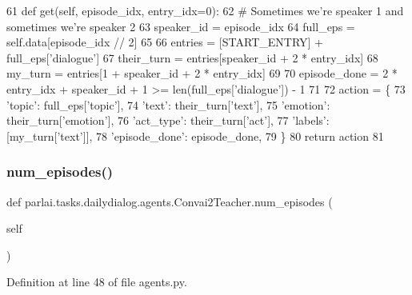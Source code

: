 \begin{DoxyCode}
61     \textcolor{keyword}{def }get(self, episode\_idx, entry\_idx=0):
62         \textcolor{comment}{# Sometimes we're speaker 1 and sometimes we're speaker 2}
63         speaker\_id = episode\_idx %
64         full\_eps = self.data[episode\_idx // 2]
65 
66         entries = [START\_ENTRY] + full\_eps[\textcolor{stringliteral}{'dialogue'}]
67         their\_turn = entries[speaker\_id + 2 * entry\_idx]
68         my\_turn = entries[1 + speaker\_id + 2 * entry\_idx]
69 
70         episode\_done = 2 * entry\_idx + speaker\_id + 1 >= len(full\_eps[\textcolor{stringliteral}{'dialogue'}]) - 1
71 
72         action = \{
73             \textcolor{stringliteral}{'topic'}: full\_eps[\textcolor{stringliteral}{'topic'}],
74             \textcolor{stringliteral}{'text'}: their\_turn[\textcolor{stringliteral}{'text'}],
75             \textcolor{stringliteral}{'emotion'}: their\_turn[\textcolor{stringliteral}{'emotion'}],
76             \textcolor{stringliteral}{'act\_type'}: their\_turn[\textcolor{stringliteral}{'act'}],
77             \textcolor{stringliteral}{'labels'}: [my\_turn[\textcolor{stringliteral}{'text'}]],
78             \textcolor{stringliteral}{'episode\_done'}: episode\_done,
79         \}
80         \textcolor{keywordflow}{return} action
81 
\end{DoxyCode}
\mbox{\label{classparlai_1_1tasks_1_1dailydialog_1_1agents_1_1Convai2Teacher_a2e260f4477f6fd9ec11a1a1663e32bef}} 
\subsubsection{\texorpdfstring{num\+\_\+episodes()}{num\_episodes()}}
{\footnotesize\ttfamily def parlai.\+tasks.\+dailydialog.\+agents.\+Convai2\+Teacher.\+num\+\_\+episodes (\begin{DoxyParamCaption}\item[{}]{self }\end{DoxyParamCaption})}



Definition at line 48 of file agents.\+py.


